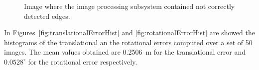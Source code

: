 \begin{figure}[htpb]
  \centering
  \qquad
  \qquad
  \qquad
  \qquad
  \caption{Image where the image processing subsystem contained not correctly detected edges.}
  \label{fig:edgeDetection82}
\end{figure}

In Figures~\ref{fig:translationalErrorHist} and \ref{fig:rotationalErrorHist} are showed the histograms of the translational an the rotational errors computed over a set of 50 images. The mean values obtained are \SI{0.2506}{\m} for the translational error and $0.0528^\circ$ for the rotational error respectively.

